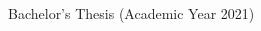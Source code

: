 \begin{titlepage}
  \begin{center}
    \begin{large}
      Bachelor's Thesis (Academic Year 2021)\\
      \vspace{24pt}
      \begin{spacing}{1.4}
        {\huge\textbf{\etitle}}\\
      \end{spacing}
    \end{large}
  \end{center}
  \vspace{40em}
  \begin{flushright}
    \large \edept\\
    \eauthor
  \end{flushright}
\end{titlepage}
